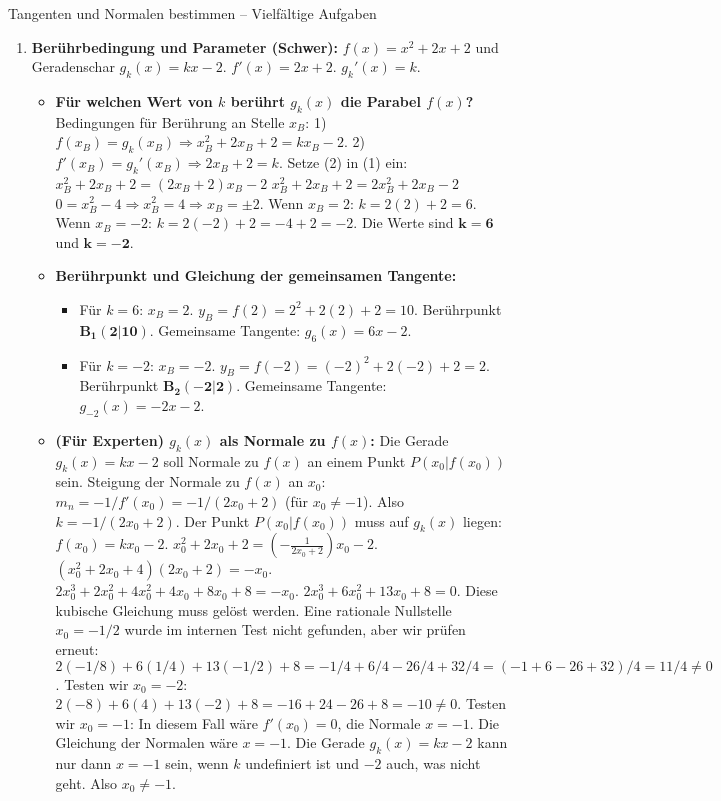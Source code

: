 \begin{loesungsumgebung}{Tangenten und Normalen bestimmen – Vielfältige Aufgaben}
\begin{enumerate}[label=(\alph*)]
    \item \textbf{Berührbedingung und Parameter (Schwer):}
    $f(x) = x^2 + 2x + 2$ und Geradenschar $g_k(x) = kx - 2$.
    $f'(x) = 2x + 2$. $g_k'(x) = k$.
    \begin{itemize}
        \item \textbf{Für welchen Wert von $k$ berührt $g_k(x)$ die Parabel $f(x)$?}
        Bedingungen für Berührung an Stelle $x_B$:
        1) $f(x_B) = g_k(x_B) \Rightarrow x_B^2 + 2x_B + 2 = kx_B - 2$.
        2) $f'(x_B) = g_k'(x_B) \Rightarrow 2x_B + 2 = k$.
        Setze (2) in (1) ein:
        $x_B^2 + 2x_B + 2 = (2x_B + 2)x_B - 2$
        $x_B^2 + 2x_B + 2 = 2x_B^2 + 2x_B - 2$
        $0 = x_B^2 - 4 \Rightarrow x_B^2 = 4 \Rightarrow x_B = \pm 2$.
        Wenn $x_B = 2$: $k = 2(2) + 2 = 6$.
        Wenn $x_B = -2$: $k = 2(-2) + 2 = -4 + 2 = -2$.
        Die Werte sind $\mathbf{k=6}$ und $\mathbf{k=-2}$.
        \item \textbf{Berührpunkt und Gleichung der gemeinsamen Tangente:}
        \begin{itemize}
            \item Für $k=6$: $x_B=2$. $y_B = f(2) = 2^2+2(2)+2 = 10$. Berührpunkt $\mathbf{B_1(2|10)}$.
            Gemeinsame Tangente: $g_6(x) = 6x-2$.
            \item Für $k=-2$: $x_B=-2$. $y_B = f(-2) = (-2)^2+2(-2)+2 = 2$. Berührpunkt $\mathbf{B_2(-2|2)}$.
            Gemeinsame Tangente: $g_{-2}(x) = -2x-2$.
        \end{itemize}
        \item \textbf{(Für Experten) $g_k(x)$ als Normale zu $f(x)$:}
        Die Gerade $g_k(x)=kx-2$ soll Normale zu $f(x)$ an einem Punkt $P(x_0|f(x_0))$ sein.
        Steigung der Normale zu $f(x)$ an $x_0$: $m_n = -1/f'(x_0) = -1/(2x_0+2)$ (für $x_0 \neq -1$).
        Also $k = -1/(2x_0+2)$.
        Der Punkt $P(x_0|f(x_0))$ muss auf $g_k(x)$ liegen: $f(x_0) = kx_0 - 2$.
        $x_0^2 + 2x_0 + 2 = \left(-\frac{1}{2x_0+2}\right)x_0 - 2$.
        $(x_0^2 + 2x_0 + 4)(2x_0+2) = -x_0$.
        $2x_0^3 + 2x_0^2 + 4x_0^2 + 4x_0 + 8x_0 + 8 = -x_0$.
        $2x_0^3 + 6x_0^2 + 13x_0 + 8 = 0$.
        Diese kubische Gleichung muss gelöst werden. Eine rationale Nullstelle $x_0=-1/2$ wurde im internen Test nicht gefunden, aber wir prüfen erneut:
        $2(-1/8) + 6(1/4) + 13(-1/2) + 8 = -1/4 + 6/4 - 26/4 + 32/4 = (-1+6-26+32)/4 = 11/4 \neq 0$.
        Testen wir $x_0=-2$: $2(-8)+6(4)+13(-2)+8 = -16+24-26+8 = -10 \neq 0$.
        Testen wir $x_0=-1$: In diesem Fall wäre $f'(x_0)=0$, die Normale $x=-1$. Die Gleichung der Normalen wäre $x=-1$. Die Gerade $g_k(x)=kx-2$ kann nur dann $x=-1$ sein, wenn $k$ undefiniert ist und $-2$ auch, was nicht geht. Also $x_0 \neq -1$.

\end{itemize}
\end{enumerate}
\end{loesungsumgebung}
